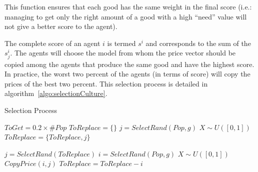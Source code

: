 \documentclass{wscpaperproc}
\begin{document}
This function ensures that each good has the same weight in the final score (i.e.: managing to get only the right amount of a good with a high ``need'' value will not give a better score to the agent).



The complete score of an agent $i$ is termed $s^i$ and corresponds to the sum of the $s^i_j$. The agents will choose the model from whom the price vector should be copied among the agents that produce the same good and have the highest score. In practice, the worst two percent of the agents (in terms of score) will copy the prices of the best two percent. This selection process is detailed in algorithm~\ref{algo:selectionCulture}.


\begin{algorithm}
\caption{Selection Process}
\label{algo:selectionCulture}
	\begin{algorithmic}[1]
	\scriptsize
	\State	$ToGet = 0.2 \times \#Pop$
		\State	$ToReplace = \{\}$
			\State $ j = SelectRand(Pop,g) $ 
			\State $X \sim U([0,1])$ 
			 
				\State $ToReplace = \{ToReplace,j\}$
			\EndIf
		\EndWhile

			\State $ j = SelectRand(ToReplace) $ 
			\State $ i = SelectRand(Pop,g) $  
			\State $X \sim U([0,1])$ 
			 
				 
					\State $CopyPrice(i,j)$
					\State $ToReplace = ToReplace - i$
				\EndIf
			\EndIf

		\EndWhile\
	\EndFor
\end{algorithmic}
\end{algorithm}
\end{document}
